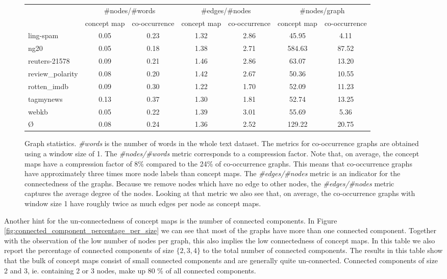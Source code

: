 \begin{figure}[htb!]
	\centering
	\begin{tabular}{lcccccc}
		{} &  \multicolumn{2}{c}{\#nodes/\#words} &  \multicolumn{2}{c}{\#edges/\#nodes} & \multicolumn{2}{c}{\#nodes/graph} \\
		{} & concept map &  co-occurrence & concept map & co-occurrence & concept map & co-occurrence\\
		\midrule
		ling-spam       & 0.05 & 0.23 & 1.32 & 2.86 & 45.95 & 4.11 \\
		ng20            & 0.05 & 0.18 & 1.38 & 2.71 & 584.63 & 87.52 \\
		reuters-21578   & 0.09 & 0.21 & 1.46 & 2.86 & 63.07 & 13.20 \\
		review\_polarity & 0.08 & 0.20 & 1.42 & 2.67 & 50.36 & 10.55 \\
		rotten\_imdb     & 0.09 & 0.30 & 1.22 & 1.70 & 52.09 & 11.23 \\
		tagmynews       & 0.13 & 0.37 & 1.30 & 1.81 & 52.74 & 13.25 \\
		webkb           & 0.05 & 0.22 & 1.39 & 3.01 & 55.69 & 5.36 \\
		\midrule
		\O{}            & 0.08 & 0.24 & 1.36 & 2.52 & 129.22 & 20.75 \\
		\bottomrule
	\end{tabular}
	\caption{Graph statistics. \textit{\#words} is the number of words in the whole text dataset. The metrics for co-occurrence graphs are obtained using a window size of 1. The \textit{\#nodes/\#words} metric corresponds to a compression factor. Note that, on average, the concept maps have a compression factor of 8\% compared to the 24\% of co-occurrence graphs. This means that co-occurrence graphs have approximately three times more node labels than concept maps. The \textit{\#edges/\#nodes} metric is an indicator for the connectedness of the graphs. Because we remove nodes which have no edge to other nodes, the \textit{\#edges/\#nodes} metric captures the average degree of the nodes. Looking at that metric we also see that, on average, the co-occurrence graphs with window size 1 have roughly twice as much edges per node as concept maps.}\label{fig:graph_statistics}
\end{figure}


Another hint for the un-connectedness of concept maps is the number of connected components.
In Figure \ref{fig:connected_component_percentage_per_size} we can see that most of the graphs have more than one connected component. Together with the observation of the low number of nodes per graph, this also implies the low connectedness of concept maps.
In this table we also report the percentage of connected components of size $\{2,3,4\}$ to the total number of connected components.
The results in this table show that the bulk of concept maps consist of small connected components and are generally quite un-connected. Connected components of size 2 and 3, ie. containing 2 or 3 nodes, make up 80 \% of all connected components.

